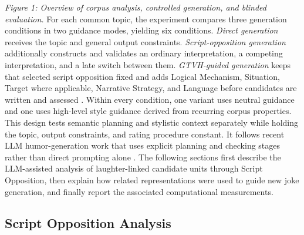\documentclass[11pt]{article}
\begin{document}
\emph{Figure 1: Overview of corpus analysis, controlled generation, and blinded evaluation.} For each common topic, the experiment compares three generation conditions in two guidance modes, yielding six conditions. \emph{Direct generation} receives the topic and general output constraints. \emph{Script-opposition generation} additionally constructs and validates an ordinary interpretation, a competing interpretation, and a late switch between them. \emph{GTVH-guided generation} keeps that selected script opposition fixed and adds Logical Mechanism, Situation, Target where applicable, Narrative Strategy, and Language before candidates are written and assessed \citep{attardo1991}. Within every condition, one variant uses neutral guidance and one uses high-level style guidance derived from recurring corpus properties. This design tests semantic planning and stylistic context separately while holding the topic, output constraints, and rating procedure constant. It follows recent LLM humor-generation work that uses explicit planning and checking stages rather than direct prompting alone \citep{suppa2026ragthoven}. The following sections first describe the LLM-assisted analysis of laughter-linked candidate units through Script Opposition, then explain how related representations were used to guide new joke generation, and finally report the associated computational measurements.

\subsection{Script Opposition Analysis}\label{script-opposition-analysis}
\end{document}
